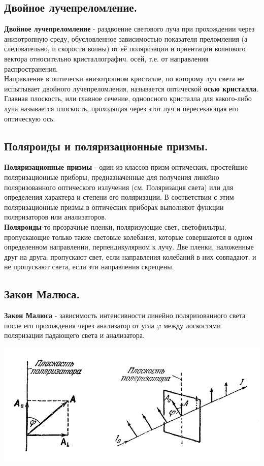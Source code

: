 \documentclass[12pt]{report}
\begin{document}
\subsection{  Двойное лучепреломление.}
\textbf{Двойное лучепреломление} - раздвоение светового луча при прохождении через анизотропную среду, обусловленное зависимостью показателя преломления (а следовательно, и скорости волны) от её поляризации и ориентации волнового вектора относительно кристаллографич. осей, т.е. от направления распространения.\\

Направление в оптически анизотропном кристалле, по которому луч света не испытывает двойного лучепреломления, называется оптической \textbf{осью кристалла}.\\

Главная плоскость, или главное сечение, одноосного кристалла для какого-либо луча называется плоскость, проходящая через этот луч и
пересекающая его оптическую ось.\\
\subsection{ Поляроиды и поляризационные призмы.}
\textbf{Поляризационные призмы} - один из классов призм оптических, простейшие поляризационные приборы, предназначенные для получения линейно поляризованного оптического излучения (см. Поляризация света) или для определения характера и степени его поляризации. В соответствии с этим поляризационные призмы в оптических приборах выполняют функции поляризаторов или анализаторов.\\

\textbf{Поляроиды}-то прозрачные пленки, поляризующие свет, светофильтры, пропускающие только такие световые колебания, которые совершаются в одном определенном направлении, перпендикулярном к лучу. Две пленки, наложенные друг на друга, пропускают свет, если направления колебаний в них совпадают, и не пропускают света, если эти направления скрещены.
\subsection{ Закон Малюса.}
\textbf{Закон Малюса} - зависимость интенсивности линейно поляризованного света после его прохождения через анализатор от угла $\varphi$ между лоскостями поляризации падающего света и анализатора.

\begin{center}
    \includegraphics[scale=0.7]{graphics/30_2.png}
\end{center}
\end{document}
